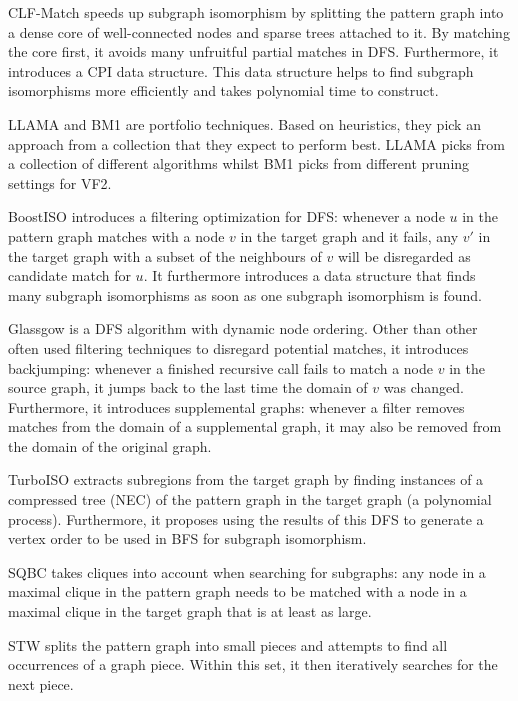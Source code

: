CLF-Match\cite{Bi2016} speeds up subgraph isomorphism by splitting the pattern graph into a dense core of well-connected nodes and sparse trees attached to it. By matching the core first, it avoids many unfruitful partial matches in DFS. Furthermore, it introduces a CPI data structure. This data structure helps to find subgraph isomorphisms more efficiently and takes polynomial time to construct.

LLAMA\cite{Kotthoff2016} and BM1\cite{Battiti2007} are portfolio techniques. Based on heuristics, they pick an approach from a collection that they expect to perform best. LLAMA picks from a collection of different algorithms whilst BM1 picks from different pruning settings for VF2.

BoostISO\cite{boostISO} introduces a filtering optimization for DFS: whenever a node $u$ in the pattern graph matches with a node $v$ in the target graph and it fails, any $v'$ in the target graph with a subset of the neighbours of $v$ will be disregarded as candidate match for $u$. It furthermore introduces a data structure that finds many subgraph isomorphisms as soon as one subgraph isomorphism is found.

Glassgow\cite{McCreesh2015} is a DFS algorithm with dynamic node ordering. Other than other often used filtering techniques to disregard potential matches, it introduces backjumping: whenever a finished recursive call fails to match a node $v$ in the source graph, it jumps back to the last time the domain of $v$ was changed. Furthermore, it introduces supplemental graphs: whenever a filter removes matches from the domain of a supplemental graph, it may also be removed from the domain of the original graph.

TurboISO\cite{Han2013} extracts subregions from the target graph by finding instances of a compressed tree (NEC) of the pattern graph in the target graph (a polynomial process). Furthermore, it proposes using the results of this DFS to generate a vertex order to be used in BFS for subgraph isomorphism.

SQBC\cite{ZHENG2014116} takes cliques into account when searching for subgraphs: any node in a maximal clique in the pattern graph needs to be matched with a node in a maximal clique in the target graph that is at least as large.

STW\cite{Sun2012788} splits the pattern graph into small pieces and attempts to find all occurrences of a graph piece. Within this set, it then iteratively searches for the next piece.


